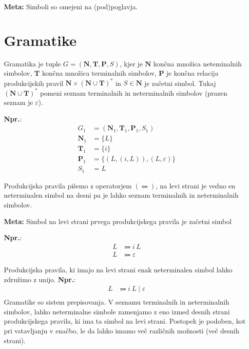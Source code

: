 \documentclass{article}
\newcommand{\Ex}{\textbf{Npr.}:\ }
\newcommand{\Special}[1]{\textbf{#1}}
\newcommand{\Set}[1]{\mathbf{#1}}
\newcommand{\Grammar}{G}
\newcommand{\Terminals}{\Set{T}}
\newcommand{\NonTerminals}{\Set{N}}
\newcommand{\Productions}{\Set{P}}
\newcommand{\StartSymbol}{S}
\newcommand{\Null}{\varepsilon}
\newcommand{\Arrow}{\Coloneqq}
\newcommand{\Seq}{\ }
\newcommand{\Union}{\mathrel{|}}
\newcommand{\Kleene}[1]{#1^\ast}
\begin{document}
\Special{Meta:} Simboli so omejeni na (pod)poglavja.

\section{Gramatike}
Gramatika je tuple $\Grammar = (\NonTerminals, \Terminals, \Productions, \StartSymbol)$, kjer je $\NonTerminals$ končna množica neteminalnih simbolov, $\Terminals$ končna množica terminalnih simbolov, $\Productions$ je končna relacija produkcijskih pravil $\NonTerminals \times \Kleene{(\NonTerminals \cup \Terminals)}$ in $\StartSymbol \in \NonTerminals$ je začetni simbol.
Tukaj $\Kleene{(\NonTerminals \cup \Terminals)}$ pomeni seznam terminalnih in neterminalnih simbolov (prazen seznam je $\Null$).

\Ex
\begin{align*}
  \Grammar_1 &= (\NonTerminals_1, \Terminals_1, \Productions_1, \StartSymbol_1) \\
  \NonTerminals_1 &= \{L\}\\
  \Terminals_1 &= \{i\}\\
  \Productions_1 &= \{ (L, (i, L)), (L, \Null) \}\\
  \StartSymbol_1 &= L
\end{align*}

Produkcijska pravila pišemo z operatorjem $(\Arrow)$, na levi strani je vedno en neterminalen simbol na desni pa je lahko seznam terminalnih in neterminalnih simbolov.

\Special{Meta:} Simbol na levi strani prvega produkcijskega pravila je začetni simbol

\Ex
\begin{equation}
  \tag{$\Grammar_1$}
  \label{g:listi}
  \begin{aligned}
    L &\Arrow i \Seq L\\
    L &\Arrow \Null
  \end{aligned}
\end{equation}

Produkcijska pravila, ki imajo na levi strani enak neterminalen simbol lahko združimo z unijo.
\Ex
\begin{align*}
  L &\Arrow i \Seq L \Union \Null\\
\end{align*}
Gramatike so sistem prepisovanja.
V seznamu terminalnih in neterminalnih simbolov, lahko neterminalne simbole zamenjamo z eno izmed desnih strani produkcijskega pravila, ki ima ta simbol na levi strani.
Postopek je podoben, kot pri vstavljanju v enačbo, le da lahko imamo več različnih možnosti (več desnih strani).
\end{document}
